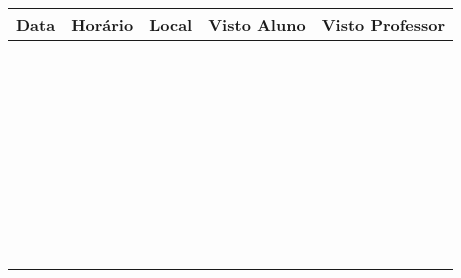 \documentclass[cocic]{handoutUtfprTcc}
\begin{document}
	\begin{table}[!h]
		\centering
		\renewcommand{\arraystretch}{1.2} %
		\begin{tabular}{|C{0.15\columnwidth}|C{0.15\columnwidth}|C{0.15\columnwidth}|C{0.17\columnwidth}|C{0.17\columnwidth}|}
			\hline
				Data & Horário & Local & Visto Aluno & Visto Professor \\
			\hline
				 &  &  &  &  \\
			\hline
				 &  &  &  &  \\
			\hline
				 &  &  &  &  \\
			\hline
				 &  &  &  &  \\
			\hline
				 &  &  &  &  \\
			\hline
				 &  &  &  &  \\
			\hline
				 &  &  &  &  \\
			\hline
				 &  &  &  &  \\
			\hline
				 &  &  &  &  \\
			\hline
				 &  &  &  &  \\
			\hline
				 &  &  &  &  \\
			\hline
				 &  &  &  &  \\
			\hline
				 &  &  &  &  \\
			\hline
				 &  &  &  &  \\
			\hline
				 &  &  &  &  \\
			\hline
				 &  &  &  &  \\
			\hline
				 &  &  &  &  \\
			\hline
				 &  &  &  &  \\
			\hline
				 &  &  &  &  \\
			\hline
				 &  &  &  &  \\
			\hline
				 &  &  &  &  \\
			\hline
				 &  &  &  &  \\
			\hline
				 &  &  &  &  \\
			\hline
				 &  &  &  &  \\
			\hline
				 &  &  &  &  \\
			\hline
				 &  &  &  &  \\
			\hline
				 &  &  &  &  \\
			\hline
				 &  &  &  &  \\
			\hline
				 &  &  &  &  \\
			\hline
				 &  &  &  &  \\
			\hline
				 &  &  &  &  \\
			\hline
				 &  &  &  &  \\
			\hline
				 &  &  &  &  \\
			\hline
				 &  &  &  &  \\
			\hline
				 &  &  &  &  \\
			\hline
				 &  &  &  &  \\
			\hline
				 &  &  &  &  \\
			\hline
				 &  &  &  &  \\
			\hline
		\end{tabular}
	\end{table}
	
\end{document}
